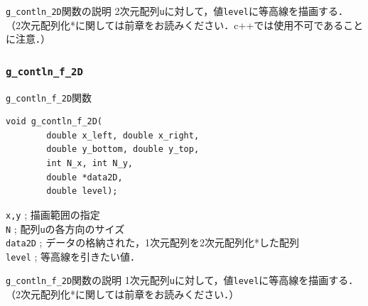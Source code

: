\documentclass[platex,a4paper,12pt]{jsarticle}%
\begin{document}
\begin{itembox}[l]{\texttt{g\_contln\_2D}関数の説明}
2次元配列\verb|u|に対して，値\verb|level|に等高線を描画する．
（2次元配列化*に関しては前章をお読みください．c++では使用不可であることに注意．）
\end{itembox}

\begin{figure}[htb]
\end{figure}




\clearpage
\subsubsection{\texttt{g\_contln\_f\_2D}}

\begin{itembox}[l]{\texttt{g\_contln\_f\_2D}関数}
\begin{verbatim}
void g_contln_f_2D(
        double x_left, double x_right,
        double y_bottom, double y_top,
        int N_x, int N_y,
        double *data2D,
        double level);
\end{verbatim}
\verb|x,y| ; 描画範囲の指定\\
\verb|N| ; 配列\verb|u|の各方向のサイズ\\
\verb|data2D| ; データの格納された，1次元配列を2次元配列化*した配列\\
\verb|level| ; 等高線を引きたい値．
\end{itembox}

\begin{itembox}[l]{\texttt{g\_contln\_f\_2D}関数の説明}
1次元配列\verb|u|に対して，値\verb|level|に等高線を描画する．
（2次元配列化*に関しては前章をお読みください．）
\end{itembox}
\end{document}
